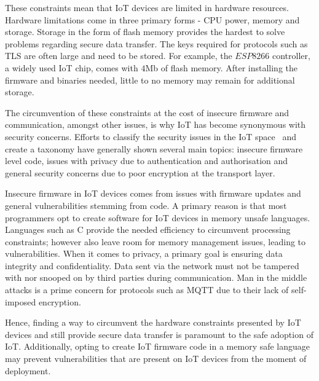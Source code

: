 These constraints mean that IoT devices are limited in hardware resources.
Hardware limitations come in three primary forms - CPU power, memory and storage.
Storage in the form of flash memory provides the hardest to solve problems regarding secure data transfer.
The keys required for protocols such as TLS are often large and need to be stored.
For example, the $ESP8266$ controller, a widely used IoT chip, comes with $4$Mb of flash memory.
After installing the firmware and binaries needed, little to no memory may remain for additional storage.

The circumvention of these constraints at the cost of insecure firmware and communication, amongst other issues, is why IoT has become synonymous with security concerns.
Efforts to classify the security issues in the IoT space~\citep{alaba_internet_2017,gupta_security_2021,swamy_security_2017} and create a taxonomy have generally shown several main topics: insecure firmware level code, issues with privacy due to authentication and authorisation and general security concerns due to poor encryption at the transport layer.

Insecure firmware in IoT devices comes from issues with firmware updates and general vulnerabilities stemming from code.
A primary reason is that most programmers opt to create software for IoT devices in memory unsafe languages.
Languages such as C provide the needed efficiency to circumvent processing constraints; however also leave room for memory management issues, leading to vulnerabilities.
When it comes to privacy, a primary goal is ensuring data integrity and confidentiality.
Data sent via the network must not be tampered with nor snooped on by third parties during communication.
Man in the middle attacks is a prime concern for protocols such as MQTT due to their lack of self-imposed encryption.

Hence, finding a way to circumvent the hardware constraints presented by IoT devices and still provide secure data transfer is paramount to the safe adoption of IoT.
Additionally, opting to create IoT firmware code in a memory safe language may prevent vulnerabilities that are present on IoT devices from the moment of deployment.
